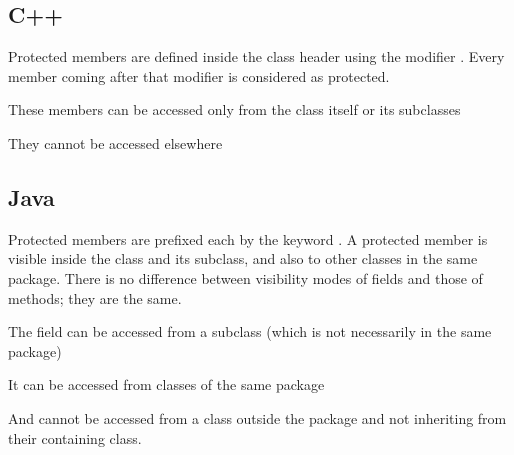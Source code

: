 \documentclass{KodeBook}
\begin{document}
\subsection{C++}

Protected members are defined inside the class header using the modifier . 
Every member coming after that modifier is considered as protected.



These members can be accessed only from the class itself or its subclasses



They cannot be accessed elsewhere



\subsection{Java}

Protected members are prefixed each by the keyword . 
A protected member is visible inside the class and its subclass, and also to other classes in the same package. 
There is no difference between visibility modes of fields and those of methods; they are the same.



The field can be accessed from a subclass (which is not necessarily in the same package)



It can be accessed from classes of the same package



And cannot be accessed from a class outside the package and not inheriting from their containing class.


\end{document}
